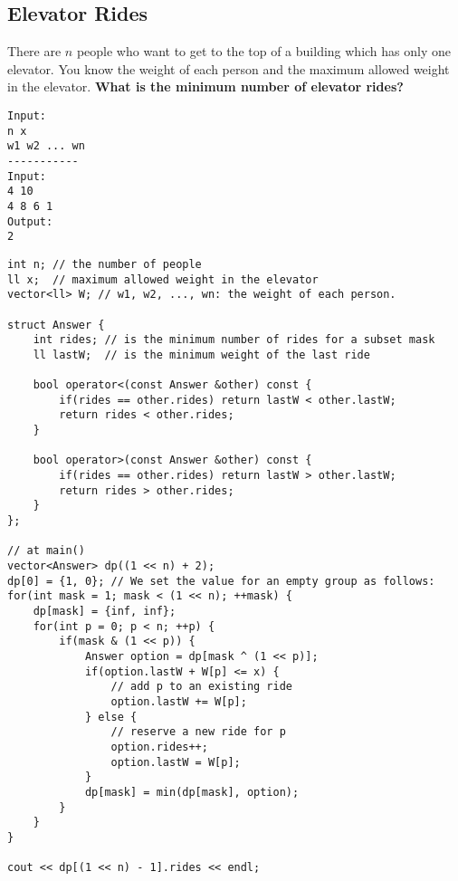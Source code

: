 \documentclass[10pt,letterpaper,twocolumn,twosided]{article}
\begin{document}
\subsection{Elevator Rides}
There are $n$ people who want to get to the top of a building which has only one elevator. You know the weight of each person and the maximum allowed weight in the elevator. \textbf{What is the minimum number of elevator rides?}
\begin{lstlisting}
Input:
n x
w1 w2 ... wn
-----------
Input:
4 10
4 8 6 1
Output:
2
\end{lstlisting}
\begin{lstlisting}
int n; // the number of people
ll x;  // maximum allowed weight in the elevator
vector<ll> W; // w1, w2, ..., wn: the weight of each person.
 
struct Answer {
    int rides; // is the minimum number of rides for a subset mask
    ll lastW;  // is the minimum weight of the last ride
 
    bool operator<(const Answer &other) const {
        if(rides == other.rides) return lastW < other.lastW;
        return rides < other.rides;
    }
 
    bool operator>(const Answer &other) const {
        if(rides == other.rides) return lastW > other.lastW;
        return rides > other.rides;
    }
};

// at main()
vector<Answer> dp((1 << n) + 2);
dp[0] = {1, 0}; // We set the value for an empty group as follows:
for(int mask = 1; mask < (1 << n); ++mask) {
    dp[mask] = {inf, inf};
    for(int p = 0; p < n; ++p) {
        if(mask & (1 << p)) {
            Answer option = dp[mask ^ (1 << p)];
            if(option.lastW + W[p] <= x) {
                // add p to an existing ride
                option.lastW += W[p];
            } else {
                // reserve a new ride for p
                option.rides++;
                option.lastW = W[p];
            }
            dp[mask] = min(dp[mask], option);
        }
    }
}

cout << dp[(1 << n) - 1].rides << endl;
\end{lstlisting}
\end{document}
